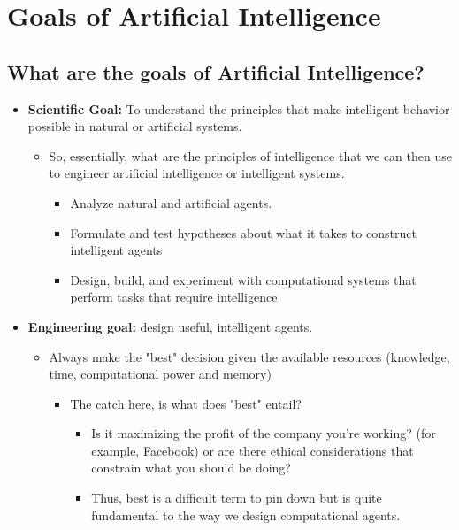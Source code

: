 \documentclass[12pt]{article}
\begin{document}
\newpage
\section{Goals of Artificial Intelligence}

\subsection{What are the goals of Artificial Intelligence?}

\begin{itemize}
    \item \textbf{Scientific Goal:} To understand the principles that make intelligent behavior possible in natural or artificial systems.
    \begin{itemize}
        \item So, essentially, what are the principles of intelligence that we can then use to engineer artificial intelligence or intelligent systems.
        \begin{itemize}
            \item Analyze natural and artificial agents.
            \item Formulate and test hypotheses about what it takes to construct intelligent agents
            \item Design, build, and experiment with computational systems that perform tasks that require intelligence
        \end{itemize}
    \end{itemize}
    \item \textbf{Engineering goal:} design useful, intelligent agents.
    \begin{itemize}
        \item Always make the "best" decision given the available resources (knowledge, time, computational power and memory)
        \begin{itemize}
            \item The catch here, is what does "best" entail?
            \begin{itemize}
                \item Is it maximizing the profit of the company you're working? (for example, Facebook) or are there ethical considerations that constrain what you should be doing?
                \item Thus, best is a difficult term to pin down but is quite fundamental to the way we design computational agents. 
            \end{itemize}

\end{itemize}
\end{itemize}
\end{itemize}
\end{document}
